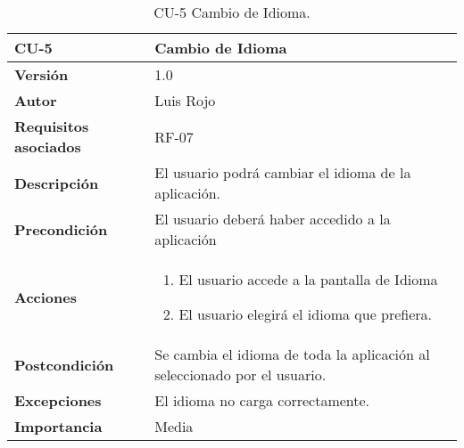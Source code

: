 \begin{table}[p]
	\centering
	\begin{tabularx}{\linewidth}{ p{} p{} }
		\toprule
		\textbf{CU-5}    & \textbf{Cambio de Idioma}\\
		\toprule
		\textbf{Versión}              & 1.0    \\
		\textbf{Autor}                & Luis Rojo \\
		\textbf{Requisitos asociados} & RF-07 \\
		\textbf{Descripción}          & El usuario podrá cambiar el idioma de la aplicación. \\
		\textbf{Precondición}         &  El usuario deberá haber accedido a la aplicación \\
		\textbf{Acciones}             &
		\begin{enumerate}
			\def\labelenumi{\arabic{enumi}.}
			\tightlist
			\item El usuario accede a la pantalla de Idioma
			\item El usuario elegirá el idioma que prefiera.
		\end{enumerate}\\
		\textbf{Postcondición}        & Se cambia el idioma de toda la aplicación al seleccionado por el usuario. \\
		\textbf{Excepciones}          &  El idioma no carga correctamente.
           \\
		\textbf{Importancia}          & Media  \\
		\bottomrule
	\end{tabularx}
	\caption{CU-5 Cambio de Idioma.}
\end{table}

